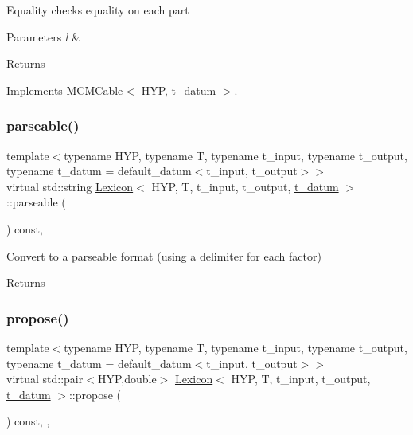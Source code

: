 Equality checks equality on each part 
\begin{DoxyParams}{Parameters}
{\em l} & \\
\hline
\end{DoxyParams}
\begin{DoxyReturn}{Returns}

\end{DoxyReturn}


Implements \hyperlink{class_m_c_m_cable_aa73001ec3bb0cf0c618281dfa998f2f1}{M\+C\+M\+Cable$<$ H\+Y\+P, t\+\_\+datum $>$}.

\mbox{\label{class_lexicon_a8eda74c4e7500b31a382c182ac60436a}} 
\subsubsection{\texorpdfstring{parseable()}{parseable()}}
{\footnotesize\ttfamily template$<$typename H\+YP, typename T, typename t\+\_\+input, typename t\+\_\+output, typename t\+\_\+datum = default\+\_\+datum$<$t\+\_\+input, t\+\_\+output$>$$>$ \\
virtual std\+::string \hyperlink{class_lexicon}{Lexicon}$<$ H\+YP, T, t\+\_\+input, t\+\_\+output, \hyperlink{class_bayesable_a7c93a2eeab708378eb321745908718d4}{t\+\_\+datum} $>$\+::parseable (\begin{DoxyParamCaption}{ }\end{DoxyParamCaption}) const\hspace{0.3cm}{\ttfamily [inline]}, {\ttfamily [virtual]}}

Convert to a parseable format (using a delimiter for each factor) \begin{DoxyReturn}{Returns}

\end{DoxyReturn}
\mbox{\label{class_lexicon_a94910b8357fe18f3ae13df8bdd56ca4e}} 
\subsubsection{\texorpdfstring{propose()}{propose()}}
{\footnotesize\ttfamily template$<$typename H\+YP, typename T, typename t\+\_\+input, typename t\+\_\+output, typename t\+\_\+datum = default\+\_\+datum$<$t\+\_\+input, t\+\_\+output$>$$>$ \\
virtual std\+::pair$<$H\+YP,double$>$ \hyperlink{class_lexicon}{Lexicon}$<$ H\+YP, T, t\+\_\+input, t\+\_\+output, \hyperlink{class_bayesable_a7c93a2eeab708378eb321745908718d4}{t\+\_\+datum} $>$\+::propose (\begin{DoxyParamCaption}{ }\end{DoxyParamCaption}) const\hspace{0.3cm}{\ttfamily [inline]}, {\ttfamily [override]}, {\ttfamily [virtual]}}


